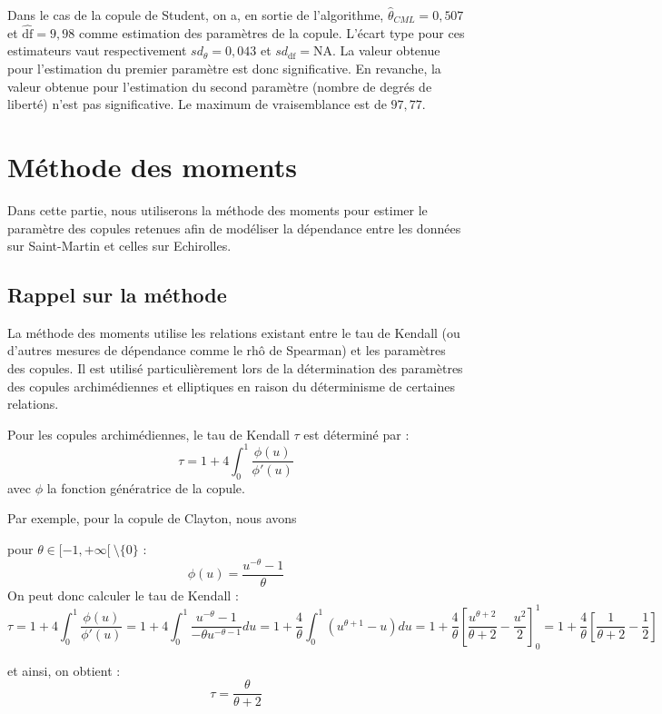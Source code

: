 Dans le cas de la copule de Student, on a, en sortie de l'algorithme, $\widehat{\theta}_{CML}=0,507$ et $\widehat{\text{df}}=9,98$ comme estimation des paramètres de la copule. L'écart type pour ces estimateurs vaut respectivement $sd_{\theta} = 0,043$ et $sd_{\text{df}} = \text{NA}$. La valeur obtenue pour l'estimation du premier paramètre est donc significative. En revanche, la valeur obtenue pour l'estimation du second paramètre (nombre de degrés de liberté) n'est pas significative. Le maximum de vraisemblance est de $97,77$. 

\section{Méthode des moments}

Dans cette partie, nous utiliserons la méthode des moments pour estimer le paramètre des copules retenues afin de modéliser la dépendance entre les données sur Saint-Martin et celles sur Echirolles.

\subsection{Rappel sur la méthode}

La méthode des moments utilise les relations existant entre le tau de Kendall (ou d'autres mesures de dépendance comme le rhô de Spearman) et les paramètres des
copules. Il est utilisé particulièrement lors de la détermination des paramètres des copules archimédiennes
et elliptiques en raison du déterminisme de certaines relations.

Pour les copules archimédiennes, le tau de Kendall $\tau$ est déterminé par :
$$
\tau = 1 + 4 \int_0^1 \frac{\phi(u)}{\phi'(u)}
$$
avec $\phi$ la fonction génératrice de la copule.

Par exemple, pour la copule de Clayton, nous avons 

pour $\theta \in [-1,+\infty[ ~\setminus \{0\}$ :
$$
\phi (u) = \frac{u^{-\theta}-1}{\theta}
$$
On peut donc calculer le tau de Kendall :
$$
\tau = 1 + 4 \int_0^1 \frac{\phi(u)}{\phi'(u)} = 1 + 4 \int_0^1 \frac{u^{-\theta} - 1}{-\theta u^{-\theta -1}} du = 1 + \frac{4}{\theta} \int_0^1 (u^{\theta + 1}-u) du
= 1 + \frac{4}{\theta} \left [  \frac{u^{\theta +2}}{\theta +2} - \frac{u^2}{2} \right ]_0^1 = 1 +\frac{4}{\theta} \left [ \frac{1}{\theta + 2} - \frac{1}{2}\right ]
$$

et ainsi, on obtient : 
$$
\tau = \frac{\theta}{\theta + 2}
$$

